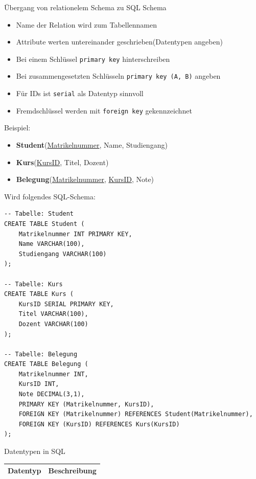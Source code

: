 \documentclass{article}
\begin{document}
\begin{block}{Übergang von relationelem Schema zu SQL Schema}
  \begin{itemize}
    \item Name der Relation wird zum Tabellennamen
    \item Attribute werten untereinander geschrieben(Datentypen angeben)
    \item Bei einem Schlüssel \texttt{primary key} hinterschreiben
    \item Bei zusammengesetzten Schlüsseln \texttt{primary key (A, B)} angeben
    \item Für IDs ist \texttt{serial} als Datentyp sinnvoll
    \item Fremdschlüssel werden mit \texttt{foreign key} gekennzeichnet
  \end{itemize}
\end{block}
Beispiel:
\begin{itemize}
  \item \textbf{Student}(\underline{Matrikelnummer}, Name, Studiengang)
  \item \textbf{Kurs}(\underline{KursID}, Titel, Dozent)
  \item \textbf{Belegung}(\underline{Matrikelnummer}, \underline{KursID}, Note)
\end{itemize}
Wird folgendes SQL-Schema:
\begin{lstlisting}
-- Tabelle: Student
CREATE TABLE Student (
    Matrikelnummer INT PRIMARY KEY,
    Name VARCHAR(100),
    Studiengang VARCHAR(100)
);

-- Tabelle: Kurs
CREATE TABLE Kurs (
    KursID SERIAL PRIMARY KEY,
    Titel VARCHAR(100),
    Dozent VARCHAR(100)
);

-- Tabelle: Belegung
CREATE TABLE Belegung (
    Matrikelnummer INT,
    KursID INT,
    Note DECIMAL(3,1),
    PRIMARY KEY (Matrikelnummer, KursID),
    FOREIGN KEY (Matrikelnummer) REFERENCES Student(Matrikelnummer),
    FOREIGN KEY (KursID) REFERENCES Kurs(KursID)
);
\end{lstlisting}

\begin{block}{Datentypen in SQL}
  \begin{tabular}{|p{4cm}|p{7cm}|}
    \hline
    \textbf{Datentyp} & \textbf{Beschreibung} \\
    \hline
    
  \end{tabular}
\end{block}
\end{document}
